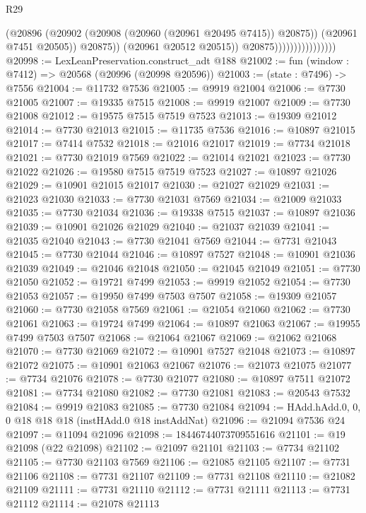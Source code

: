 \begin{lexlean}{R29}
\begin{coremodule}
                                          (@20896
                                            (@20902 (@20908 (@20960 (@20961 @20495 @7415)) @20875))
                                            (@20961 @7451 @20505))
                                          @20875))
                                      (@20961 @20512 @20515))
                                    @20875))))))))))))))))
@20998 := LexLeanPreservation.construct_adt @188
@21002 := fun (window : @7412) => @20568 (@20996 (@20998 @20596))
@21003 := (state : @7496) -> @7556
@21004 := @11732 @7536
@21005 := @9919 @21004
@21006 := @7730 @21005
@21007 := @19335 @7515
@21008 := @9919 @21007
@21009 := @7730 @21008
@21012 := @19575 @7515 @7519 @7523
@21013 := @19309 @21012
@21014 := @7730 @21013
@21015 := @11735 @7536
@21016 := @10897 @21015
@21017 := @7414 @7532
@21018 := @21016 @21017
@21019 := @7734 @21018
@21021 := @7730 @21019 @7569
@21022 := @21014 @21021
@21023 := @7730 @21022
@21026 := @19580 @7515 @7519 @7523
@21027 := @10897 @21026
@21029 := @10901 @21015 @21017
@21030 := @21027 @21029
@21031 := @21023 @21030
@21033 := @7730 @21031 @7569
@21034 := @21009 @21033
@21035 := @7730 @21034
@21036 := @19338 @7515
@21037 := @10897 @21036
@21039 := @10901 @21026 @21029
@21040 := @21037 @21039
@21041 := @21035 @21040
@21043 := @7730 @21041 @7569
@21044 := @7731 @21043
@21045 := @7730 @21044
@21046 := @10897 @7527
@21048 := @10901 @21036 @21039
@21049 := @21046 @21048
@21050 := @21045 @21049
@21051 := @7730 @21050
@21052 := @19721 @7499
@21053 := @9919 @21052
@21054 := @7730 @21053
@21057 := @19950 @7499 @7503 @7507
@21058 := @19309 @21057
@21060 := @7730 @21058 @7569
@21061 := @21054 @21060
@21062 := @7730 @21061
@21063 := @19724 @7499
@21064 := @10897 @21063
@21067 := @19955 @7499 @7503 @7507
@21068 := @21064 @21067
@21069 := @21062 @21068
@21070 := @7730 @21069
@21072 := @10901 @7527 @21048
@21073 := @10897 @21072
@21075 := @10901 @21063 @21067
@21076 := @21073 @21075
@21077 := @7734 @21076
@21078 := @7730 @21077
@21080 := @10897 @7511 @21072
@21081 := @7734 @21080
@21082 := @7730 @21081
@21083 := @20543 @7532
@21084 := @9919 @21083
@21085 := @7730 @21084
@21094 := HAdd.hAdd.{0, 0, 0} @18 @18 @18 (instHAdd.{0} @18 instAddNat)
@21096 := @21094 @7536 @24
@21097 := @11094 @21096
@21098 := 18446744073709551616
@21101 := @19 @21098 (@22 @21098)
@21102 := @21097 @21101
@21103 := @7734 @21102
@21105 := @7730 @21103 @7569
@21106 := @21085 @21105
@21107 := @7731 @21106
@21108 := @7731 @21107
@21109 := @7731 @21108
@21110 := @21082 @21109
@21111 := @7731 @21110
@21112 := @7731 @21111
@21113 := @7731 @21112
@21114 := @21078 @21113

\end{coremodule}
\end{lexlean}
